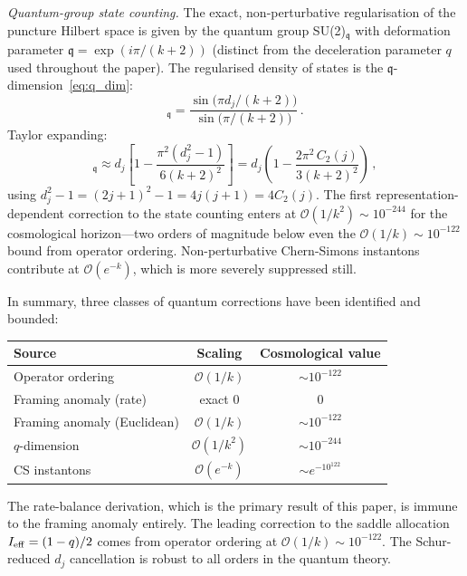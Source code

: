 \documentclass[aps,prd,twocolumn,10pt,superscriptaddress,nofootinbib]{revtex4-2}
\begin{document}
\emph{Quantum-group state counting.}  The exact,
non-perturbative regularisation of the puncture Hilbert space is
given by the quantum group SU(2)$_{\mathfrak{q}}$ with deformation
parameter $\mathfrak{q} = \exp(i\pi/(k+2))$ (distinct from the
deceleration parameter $q$ used throughout the paper).  The
regularised density of states is the $\mathfrak{q}$-dimension~\eqref{eq:q_dim}:
\begin{equation}
[d_j]_{\mathfrak{q}}
  = \frac{\sin\!\bigl(\pi d_j/(k+2)\bigr)}
         {\sin\!\bigl(\pi/(k+2)\bigr)}\,.
\end{equation}
Taylor expanding:
\begin{equation}
[d_j]_{\mathfrak{q}}
  \approx d_j\left[
    1 - \frac{\pi^2(d_j^2 - 1)}{6(k+2)^2}\right]
  = d_j\left(
    1 - \frac{2\pi^2\,C_2(j)}{3(k+2)^2}\right)\,,
\label{eq:q_dim_expand}
\end{equation}
using $d_j^2 - 1 = (2j+1)^2 - 1 = 4j(j+1) = 4C_2(j)$.  The
first representation-dependent correction to the state counting
enters at $\mathcal{O}(1/k^2) \sim 10^{-244}$ for the
cosmological horizon---two orders of magnitude below even the
$\mathcal{O}(1/k) \sim 10^{-122}$ bound from operator ordering.
Non-perturbative Chern-Simons instantons contribute at
$\mathcal{O}(e^{-k})$, which is more severely suppressed still.

In summary, three classes of quantum corrections have been
identified and bounded:
\begin{center}
\small
\begin{tabular}{lcc}
\toprule
Source & Scaling & Cosmological value \\
\midrule
Operator ordering & $\mathcal{O}(1/k)$ & $\sim 10^{-122}$ \\
Framing anomaly (rate) & exact $0$ & $0$ \\
Framing anomaly (Euclidean) & $\mathcal{O}(1/k)$ & $\sim 10^{-122}$ \\
$q$-dimension & $\mathcal{O}(1/k^2)$ & $\sim 10^{-244}$ \\
CS instantons & $\mathcal{O}(e^{-k})$ & $\sim e^{-10^{122}}$ \\
\bottomrule
\end{tabular}
\end{center}
\noindent The rate-balance derivation, which is the primary result
of this paper, is immune to the framing anomaly entirely.  The
leading correction to the saddle allocation $I_{\rm eff} = (1-q)/2$
comes from operator ordering at $\mathcal{O}(1/k) \sim 10^{-122}$.
The Schur-reduced $d_j$ cancellation is robust to all orders in
the quantum theory.
\end{document}
